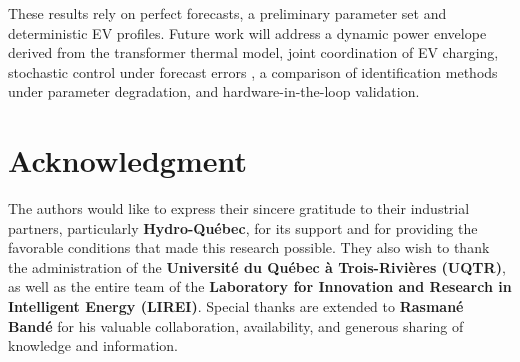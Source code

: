 \documentclass[conference]{IEEEtran}
\begin{document}
These results rely on perfect forecasts, a preliminary parameter set and deterministic EV profiles. Future work will address a dynamic power envelope derived from the transformer thermal model, joint coordination of EV charging, stochastic control under forecast errors \cite{Oldewurtel2012}, a comparison of identification methods under parameter degradation, and hardware-in-the-loop validation.

\section*{\textbf{Acknowledgment}}
The authors would like to express their sincere gratitude to their industrial partners, particularly \textbf{Hydro-Québec}, for its support and for providing the favorable conditions that made this research possible. They also wish to thank the administration of the \textbf{Université du Québec à Trois-Rivières (UQTR)}, as well as the entire team of the \textbf{Laboratory for Innovation and Research in Intelligent Energy (LIREI)}. Special thanks are extended to \textbf{Rasmané Bandé} for his valuable collaboration, availability, and generous sharing of knowledge and information.



\end{document}
